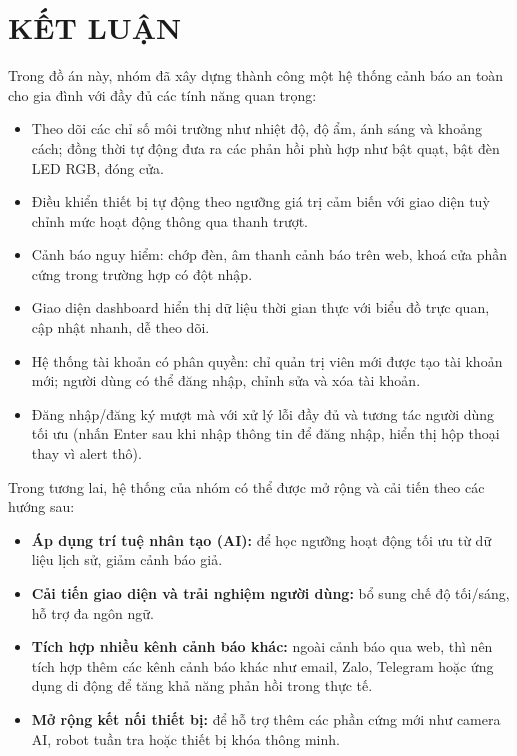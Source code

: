 \newpage
\section{KẾT LUẬN}

Trong đồ án này, nhóm đã xây dựng thành công một hệ thống cảnh báo an toàn cho gia đình với đầy đủ các tính năng quan trọng:

\begin{itemize}
    \item Theo dõi các chỉ số môi trường như nhiệt độ, độ ẩm, ánh sáng và khoảng cách; đồng thời tự động đưa ra các phản hồi phù hợp như bật quạt, bật đèn LED RGB, đóng cửa.
    \item Điều khiển thiết bị tự động theo ngưỡng giá trị cảm biến với giao diện tuỳ chỉnh mức hoạt động thông qua thanh trượt.
    \item Cảnh báo nguy hiểm: chớp đèn, âm thanh cảnh báo trên web, khoá cửa phần cứng trong trường hợp có đột nhập.
    \item Giao diện dashboard hiển thị dữ liệu thời gian thực với biểu đồ trực quan, cập nhật nhanh, dễ theo dõi.
    \item Hệ thống tài khoản có phân quyền: chỉ quản trị viên mới được tạo tài khoản mới; người dùng có thể đăng nhập, chỉnh sửa và xóa tài khoản.
    \item Đăng nhập/đăng ký mượt mà với xử lý lỗi đầy đủ và tương tác người dùng tối ưu (nhấn Enter sau khi nhập thông tin để đăng nhập, hiển thị hộp thoại thay vì alert thô).
\end{itemize}

Trong tương lai, hệ thống của nhóm có thể được mở rộng và cải tiến theo các hướng sau:

\begin{itemize}
    \item \textbf{Áp dụng trí tuệ nhân tạo (AI): } để học ngưỡng hoạt động tối ưu từ dữ liệu lịch sử, giảm cảnh báo giả.
    \item \textbf{Cải tiến giao diện và trải nghiệm người dùng: }bổ sung chế độ tối/sáng, hỗ trợ đa ngôn ngữ.
    \item \textbf{Tích hợp nhiều kênh cảnh báo khác: } ngoài cảnh báo qua web, thì nên tích hợp thêm các kênh cảnh báo khác như email, Zalo, Telegram hoặc ứng dụng di động để tăng khả năng phản hồi trong thực tế.
    \item \textbf{Mở rộng kết nối thiết bị: } để hỗ trợ thêm các phần cứng mới như camera AI, robot tuần tra hoặc thiết bị khóa thông minh.
\end{itemize}
